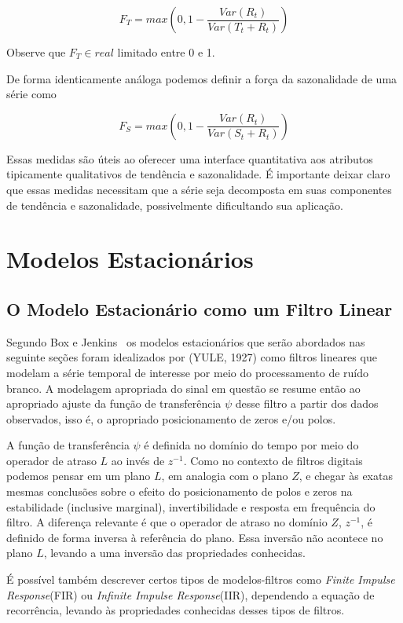 $$ F_T = max\left(0, 1 - \frac{Var(R_t)}{Var(T_t + R_t)}\right) $$

Observe que $F_T \in real$ limitado entre 0 e 1.

De forma identicamente análoga podemos definir a força da sazonalidade de uma
série como

$$ F_S = max\left(0, 1 - \frac{Var(R_t)}{Var(S_t + R_t)}\right) $$

Essas medidas são úteis ao oferecer uma interface quantitativa aos atributos
tipicamente qualitativos de tendência e sazonalidade. É importante deixar
claro que essas medidas necessitam que a série seja decomposta em suas
componentes de tendência e sazonalidade, possivelmente dificultando sua
aplicação.

\section{Modelos Estacionários}

\subsection{O Modelo Estacionário como um Filtro Linear}

Segundo Box e Jenkins~\cite[capítulo~1.2.1]{box} os modelos estacionários que
serão abordados nas seguinte seções foram idealizados por (YULE, 1927) como
filtros lineares que modelam a série temporal de interesse por meio do
processamento de ruído branco. A modelagem apropriada do sinal em questão se
resume então ao apropriado ajuste da função de transferência $\psi$ desse
filtro a partir dos dados observados, isso é, o apropriado posicionamento de
zeros e/ou polos.

A função de transferência $\psi$ é definida no domínio do tempo por meio do
operador de atraso $L$ ao invés de $z^{-1}$. Como no contexto de filtros
digitais podemos pensar em um plano $L$, em analogia com o plano $Z$, e chegar às
exatas mesmas conclusões sobre o efeito do posicionamento de polos e zeros na
estabilidade (inclusive marginal), invertibilidade e resposta em frequência do
filtro. A diferença relevante é que o operador de atraso no domínio $Z$,
$z^{-1}$, é definido de forma inversa à referência do plano. Essa inversão não
acontece no plano $L$, levando a uma inversão das propriedades conhecidas.

É possível também descrever certos tipos de modelos-filtros como \emph{Finite
Impulse Response}(FIR) ou \emph{Infinite Impulse Response}(IIR), dependendo
a equação de recorrência, levando às propriedades conhecidas desses tipos de
filtros.

